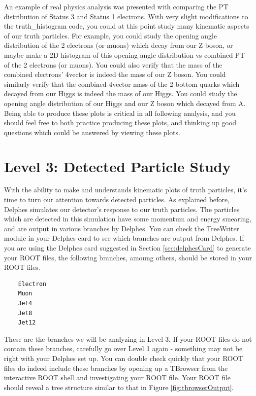 \documentclass{article}
\begin{document}
An example of real physics analysis was presented with comparing the PT distribution of Status
3 and Status 1 electrons. With very slight modifications to the truth\_histogram code, you could
at this point study many kinematic aspects of our truth particles. For example, you could study
the opening angle distribution of the 2 electrons (or muons) which decay from our Z boson, or
maybe make a 2D histogram of this opening angle distribution vs combined PT of the 2 electrons
(or muons). You could also verify that the mass of the combined electrons' 4vector is indeed
the mass of our Z boson. You could similarly verify that the combined 4vector mass of the 2
bottom quarks which decayed from our Higgs is indeed the mass of our Higgs. You could study
the opening angle distribution of our Higgs and our Z boson which decayed from A. Being able
to produce these plots is critical in all following analysis, and you should feel free to both
practice producing these plots, and thinking up good questions which could be answered by viewing these plots.

\section{Level 3: Detected Particle Study}

With the ability to make and understands kinematic plots of truth particles, it's time to turn
our attention towards detected particles. As explained before, Delphes simulates our detector's
response to our truth particles. The particles which are detected in this simulation have some
momentum and energy smearing, and are output in various branches by Delphes. You can check the
TreeWriter module in your Delphes card to see which branches are output from Delphes. If you are
using the Delphes card suggested in Section \ref{sec:delphesCard} to generate your ROOT files, 
the following branches, amoung others, should be stored in your ROOT files.

\begin{verbatim}
	Electron
	Muon
	Jet4
	Jet8
	Jet12
\end{verbatim}

These are the branches we will be analyzing in Level 3. If your ROOT files do not contain
these branches, carefully go over Level 1 again - something may not be right with your
Delphes set up. You can double check quickly that your
ROOT files do indeed include these branches by opening up a TBrowser from the interactive
ROOT shell and investigating your ROOT file. Your ROOT file should reveal a tree structure
similar to that in Figure \ref{fig:tbrowserOutput}.
\end{document}
